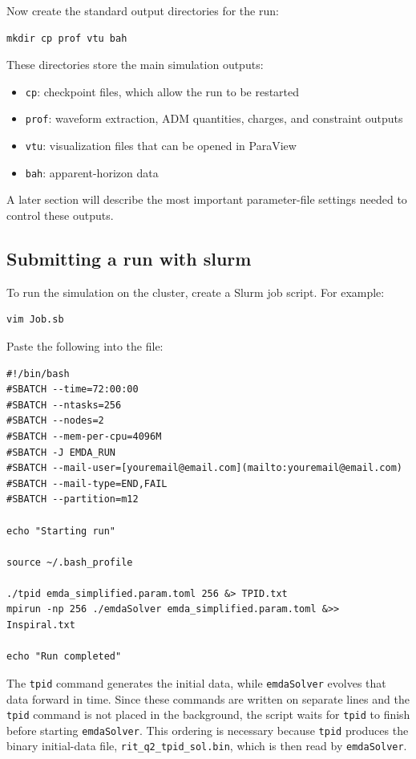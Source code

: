 Now create the standard output directories for the run:

\begin{verbatim}
mkdir cp prof vtu bah
\end{verbatim}

These directories store the main simulation outputs:
\begin{itemize}
\item \texttt{cp}: checkpoint files, which allow the run to be restarted
\item \texttt{prof}: waveform extraction, ADM quantities, charges, and constraint outputs
\item \texttt{vtu}: visualization files that can be opened in ParaView
\item \texttt{bah}: apparent-horizon data
\end{itemize}

A later section will describe the most important parameter-file settings needed
to control these outputs.


\subsection{Submitting a run with slurm}

To run the simulation on the cluster, create a Slurm job script. For example:

\begin{verbatim}
vim Job.sb
\end{verbatim}

Paste the following into the file:

\begin{verbatim}
#!/bin/bash
#SBATCH --time=72:00:00
#SBATCH --ntasks=256
#SBATCH --nodes=2
#SBATCH --mem-per-cpu=4096M
#SBATCH -J EMDA_RUN
#SBATCH --mail-user=[youremail@email.com](mailto:youremail@email.com)
#SBATCH --mail-type=END,FAIL
#SBATCH --partition=m12

echo "Starting run"

source ~/.bash_profile

./tpid emda_simplified.param.toml 256 &> TPID.txt
mpirun -np 256 ./emdaSolver emda_simplified.param.toml &>> Inspiral.txt

echo "Run completed"
\end{verbatim}

The \texttt{tpid} command generates the initial data, while
\texttt{emdaSolver} evolves that data forward in time. Since these commands are
written on separate lines and the \texttt{tpid} command is not placed in the
background, the script waits for \texttt{tpid} to finish before starting
\texttt{emdaSolver}. This ordering is necessary because \texttt{tpid} produces
the binary initial-data file, \texttt{rit\_q2\_tpid\_sol.bin}, which is then
read by \texttt{emdaSolver}.

